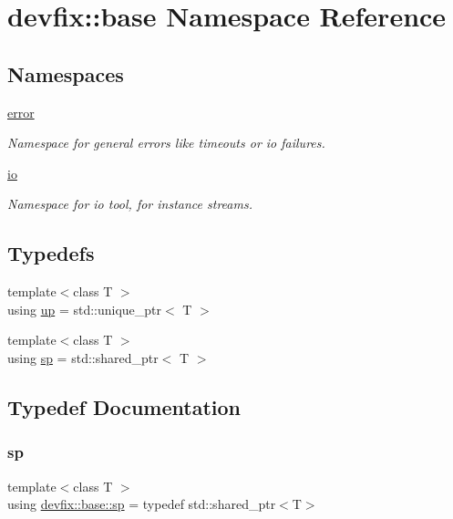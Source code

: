 \hypertarget{namespacedevfix_1_1base}{}\section{devfix\+:\+:base Namespace Reference}
\label{namespacedevfix_1_1base}
\subsection*{Namespaces}
\begin{DoxyCompactItemize}
\item 
 \hyperlink{namespacedevfix_1_1base_1_1error}{error}
\begin{DoxyCompactList}\small\item\em Namespace for general errors like timeouts or io failures. \end{DoxyCompactList}\item 
 \hyperlink{namespacedevfix_1_1base_1_1io}{io}
\begin{DoxyCompactList}\small\item\em Namespace for io tool, for instance streams. \end{DoxyCompactList}\end{DoxyCompactItemize}
\subsection*{Typedefs}
\begin{DoxyCompactItemize}
\item 
{\footnotesize template$<$class T $>$ }\\using \hyperlink{namespacedevfix_1_1base_a18dfbd492717795cee1cfa6f14a8f724}{up} = std\+::unique\+\_\+ptr$<$ T $>$
\item 
{\footnotesize template$<$class T $>$ }\\using \hyperlink{namespacedevfix_1_1base_ad239a07977b9e77ffabaf558636d0b8b}{sp} = std\+::shared\+\_\+ptr$<$ T $>$
\end{DoxyCompactItemize}


\subsection{Typedef Documentation}
\mbox{\label{namespacedevfix_1_1base_ad239a07977b9e77ffabaf558636d0b8b}} 
\subsubsection{\texorpdfstring{sp}{sp}}
{\footnotesize\ttfamily template$<$class T $>$ \\
using \hyperlink{namespacedevfix_1_1base_ad239a07977b9e77ffabaf558636d0b8b}{devfix\+::base\+::sp} = typedef std\+::shared\+\_\+ptr$<$T$>$}


